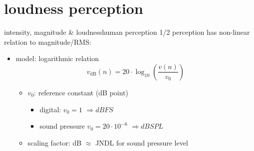     \section[perception]{loudness perception}
        \begin{frame}{intensity, magnitude \& loudness}{human perception 1/2}
            perception has non-linear relation to magnitude/RMS:
            \begin{itemize}
                \item	model: logarithmic relation
                    \begin{equation*}
                        v_\mathrm{dB}(n) = 20\cdot\log_{10}\left(\frac{v(n)}{v_0}\right)
                    \end{equation*}
        

                    \begin{itemize}
                        \item	$v_0$: reference constant (\unit[0]{dB} point)
                            \begin{itemize}
                                \item   digital: $v_0 = 1$ $\Rightarrow \unit{dBFS}$
                                \item   sound pressure $v_0 = 20\cdot10^{-6}$ $\Rightarrow \unit{dBSPL}$
                            \end{itemize}
                        
                        \smallskip
                        \item	scaling	factor: \unit[1]{dB} $\approx$ JNDL for sound pressure level
                    \end{itemize}
            \end{itemize}
        \end{frame}
        
